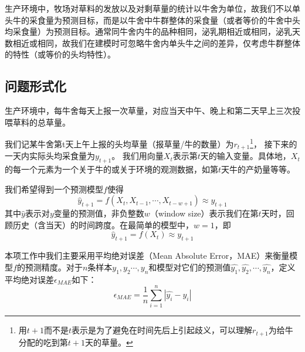生产环境中，牧场对草料的发放以及对剩草量的统计以牛舍为单位，故我们不以单头牛的采食量为预测目标，而是以牛舍中牛群整体的采食量（或者等价的牛舍中头均采食量）为预测目标。通常同牛舍内牛的品种相同，泌乳期相近或相同，泌乳天数相近或相同，故我们在建模时可忽略牛舍内单头牛之间的差异，仅考虑牛群整体的特性（或等价的头均特性）。

\subsection{问题形式化}

生产环境中，每牛舍每天上报一次草量，对应当天中午、晚上和第二天早上三次投喂草料的总草量。

我们记某牛舍第t天上午上报的头均草量（报草量/牛的数量）为$r_{t+1}$\footnote{用$t+1$而不是$t$表示是为了避免在时间先后上引起歧义，可以理解$r_{t+1}$为给牛分配的吃到第$t+1$天的草量。}，
接下来的一天内实际头均采食量为$y_{t+1}$。
我们用向量$X_t$表示第$t$天的输入变量。具体地，$X_t$的每一个元素为一个关于牛的或关于环境的观测数据，如第$t$天牛的产奶量等等。

我们希望得到一个预测模型$f$使得
\begin{equation}
	\hat y_{t+1} = f(X_t, X_{t-1}, \cdots, X_{t-w+1}) \approx {y_{t+1}}
\end{equation}
其中$\hat y$表示对$y$变量的预测值，非负整数$w$（window size）表示我们在第$t$天时，回顾历史（含当天）的时间跨度。在最简单的模型中，$w=1$，即
\begin{equation}
	\hat y_{t+1} = f(X_t) \approx {y_{t+1}}
\end{equation}

本项工作中我们主要采用平均绝对误差（Mean Absolute Error，MAE）来衡量模型$f$的预测精度。对于$n$条样本$y_1, y_2 \cdots, y_{n}$和模型对它们的预测值$\hat{y_1}, \hat{y_2}, \cdots, \hat{y_{n}}$，定义平均绝对误差$\epsilon_{MAE}$如下：
\begin{equation}
	\epsilon_{MAE} = \frac 1 n \sum_{i=1}^{n} | \hat{y_i} - y_i | 
\end{equation}







